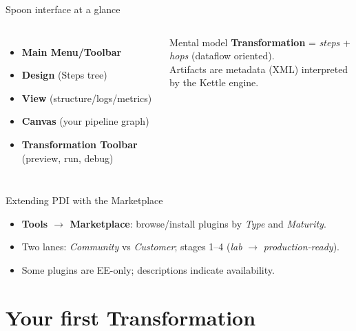 \documentclass[aspectratio=169]{beamer}
\begin{document}
\begin{frame}{Spoon interface at a glance}
    \begin{columns}[T,onlytextwidth]
        \begin{itemize}
            \item \textbf{Main Menu/Toolbar}
            \item \textbf{Design} (Steps tree)
            \item \textbf{View} (structure/logs/metrics)
            \item \textbf{Canvas} (your pipeline graph)
            \item \textbf{Transformation Toolbar} (preview, run, debug)
        \end{itemize}
        \begin{block}{Mental model}
            \textbf{Transformation} = \emph{steps} + \emph{hops} (dataflow oriented).\\
            Artifacts are metadata (XML) interpreted by the Kettle engine.
        \end{block}
    \end{columns}
\end{frame}

\begin{frame}{Extending PDI with the Marketplace}
    \begin{itemize}
    \item \textbf{Tools \(\rightarrow\) Marketplace}: browse/install plugins by \emph{Type} and \emph{Maturity}.
    \item Two lanes: \emph{Community} vs \emph{Customer}; stages 1–4 (\emph{lab} \(\rightarrow\) \emph{production-ready}).
    \item Some plugins are EE-only; descriptions indicate availability.
    \end{itemize}
\end{frame}

\section{Your first Transformation}
\end{document}
